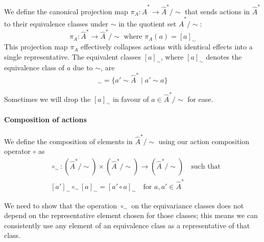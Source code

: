 We define the canonical projection map $\pi_{A}: \hat{A}^{\ast} \to \hat{A}^{\ast}/\sim$ that sends actions in $\hat{A}^{\ast}$ to their equivalence classes under $\sim$ in the quotient set $\hat{A}^{\ast}/\sim$:
\begin{equation}
    \pi_{A}: \hat{A}^{\ast} \to \hat{A}^{\ast}/\sim \text{ where } \pi_{A}(a) = [a]_{\sim}
\end{equation}
This projection map $\pi_{A}$ effectively collapses actions with identical effects into a single representative.
The equivalent classes $[a]_{\sim}$, where $[a]_{\sim}$ denotes the equivalence class of $a$ due to $\sim$, are
\begin{equation}
    [a]_{\sim} = \{ a' \sim \hat{A}^{\ast} \mid a' \sim a \}
\end{equation}



Sometimes we will drop the $[a]_{\sim}$ in favour of $a \in \hat{A}^{\ast}/\sim$ for ease.

\paragraph{Composition of actions}
We define the composition of elements in $\hat{A}^{\ast}/\sim$ using our action composition operator $\circ$ as
\begin{equation}
\begin{aligned}
    & \circ_{\sim}: (\hat{A}^{\ast}/\sim) \times (\hat{A}^{\ast}/\sim) \to (\hat{A}^{\ast}/\sim) \quad \text{such that} \\
    & [a']_{\sim} \circ_{\sim} [a]_{\sim} = [a' \circ a]_{\sim} \quad \text{for $a,a' \in \hat{A}^{\ast}$}
\end{aligned}
\end{equation}


We need to show that the operation $\circ_{\sim}$ on the equivariance classes does not depend on the representative element chosen for those classes; this means we can consistently use any element of an equivalence class as a representative of that class.

